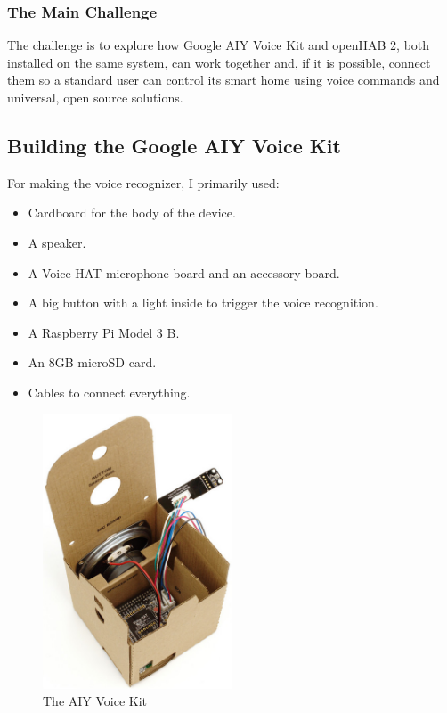 \subsubsection{The Main Challenge}
The challenge is to explore how Google AIY Voice Kit and openHAB 2, both installed on the same system, can work together and,
if it is possible, connect them so a standard user can control its smart home using voice commands and universal, open source solutions.

\subsection{Building the Google AIY Voice Kit}
For making the voice recognizer, I primarily used:

\begin{itemize}
    \item Cardboard for the body of the device.
    \item A speaker.
    \item A Voice HAT microphone board and an accessory board.
    \item A big button with a light inside to trigger the voice recognition.
    \item A Raspberry Pi Model 3 B.
    \item An 8GB microSD card.
    \item Cables to connect everything.
\end{itemize}

\begin{figure}
    \centering
    \includegraphics[width=0.5\textwidth]{images/Chapter_06/aiy-voice-kit.jpeg}
    \caption{The AIY Voice Kit}
    \label{fig:aiy-voice-kit}
\end{figure}

